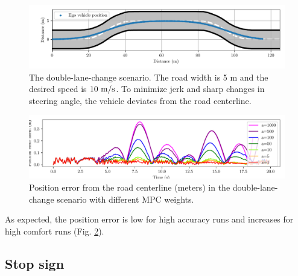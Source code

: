 \documentclass[letterpaper, 10 pt, conference]{ieeeconf}  %
\begin{document}
 
 \begin{figure}[h]
 	\centering
 	\includegraphics[width=1.0\linewidth]{figures/double_lane_change.pdf}
 	\caption{The double-lane-change scenario. The road width is 5 m and the desired speed is $10\ \text{m}/\text{s}$. To minimize jerk and sharp changes in steering angle, the vehicle deviates from the road centerline.}
 	\label{fig:trajectory(lanechange)}
 \end{figure}
 
 \vspace{-0.5em}
 \begin{figure}[h]
 	\centering
 	\includegraphics[width=1.0\linewidth]{figures/Position_error(lanechange).pdf}
 	\caption{Position error from the road centerline (meters) in the double-lane-change scenario with different MPC weights.}
 	\label{fig:error(lanechange)}
 \end{figure}
 
 As expected, the position error is low for high accuracy runs and increases for high comfort runs (Fig. \ref{fig:error(lanechange)}).
 
 \subsection{Stop sign}
 
\end{document}
